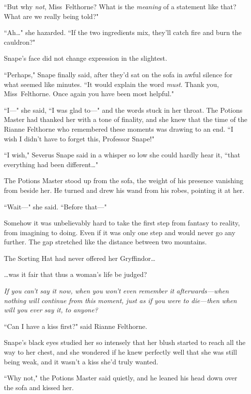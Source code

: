 ``But why \emph{not}, Miss~Felthorne? What is the \emph{meaning} of a statement like that? What are we really being told?"

``Ah{\ldots}" she hazarded. ``If the two ingredients mix, they'll catch fire and burn the cauldron?"

Snape's face did not change expression in the slightest.

``Perhaps," Snape finally said, after they'd sat on the sofa in awful silence for what seemed like minutes. ``It would explain the word \emph{must}. Thank you, Miss~Felthorne. Once again you have been most helpful."

``I—" she said, ``I was glad to—" and the words stuck in her throat. The Potions Master had thanked her with a tone of finality, and she knew that the time of the Rianne Felthorne who remembered these moments was drawing to an end. ``I wish I didn't have to forget this, Professor Snape!"

``I wish," Severus Snape said in a whisper so low she could hardly hear it, ``that everything had been different{\ldots}"

The Potions Master stood up from the sofa, the weight of his presence vanishing from beside her. He turned and drew his wand from his robes, pointing it at her.

``Wait—" she said. ``Before that—"

Somehow it was unbelievably hard to take the first step from fantasy to reality, from imagining to doing. Even if it was only one step and would never go any further. The gap stretched like the distance between two mountains.

The Sorting Hat had never offered her Gryffindor{\ldots}

{\ldots}was it fair that thus a woman's life be judged?

\emph{If you can't say it now, when you won't even remember it afterwards—when nothing will continue from this moment, just as if you were to die—then when will you ever say it, to anyone?}

``Can I have a kiss first?" said Rianne Felthorne.

Snape's black eyes studied her so intensely that her blush started to reach all the way to her chest, and she wondered if he knew perfectly well that she was still being weak, and it wasn't a kiss she'd truly wanted.

``Why not," the Potions Master said quietly, and he leaned his head down over the sofa and kissed her.

